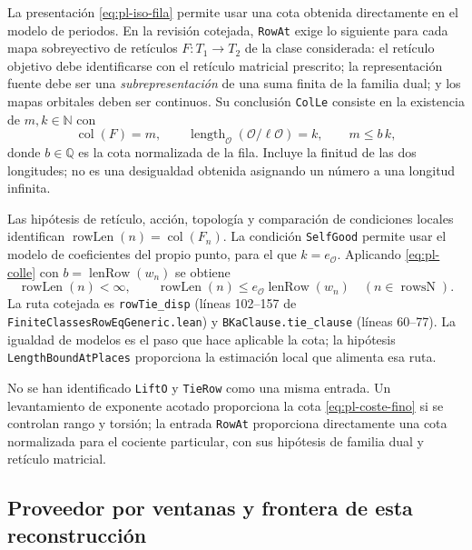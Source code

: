 La presentación \eqref{eq:pl-iso-fila} permite usar una cota
obtenida directamente en el modelo de periodos. En la revisión
cotejada, \texttt{RowAt} exige lo siguiente para cada mapa
sobreyectivo de retículos $F:T_1\to T_2$ de la clase considerada:
el retículo objetivo debe identificarse con el retículo matricial
prescrito; la representación fuente debe ser una
\emph{subrepresentación} de una suma finita de la familia dual;
y los mapas orbitales deben ser continuos. Su conclusión
\texttt{ColLe} consiste en la existencia de $m,k\in\mathbb N$ con
\begin{equation}
 \operatorname{col}(F)=m,\qquad
 \operatorname{length}_{\mathcal O}(\mathcal O/\ell\mathcal O)=k,
 \qquad m\leq b\,k,
 \label{eq:pl-colle}
\end{equation}
donde $b\in\mathbb Q$ es la cota normalizada de la fila. Incluye
la finitud de las dos longitudes; no es una desigualdad obtenida
asignando un número a una longitud infinita.

Las hipótesis de retículo, acción, topología y comparación de
condiciones locales identifican
$\operatorname{rowLen}(n)=\operatorname{col}(F_n)$. La condición
\texttt{SelfGood} permite usar el modelo de coeficientes del
propio punto, para el que $k=e_{\mathcal O}$. Aplicando
\eqref{eq:pl-colle} con $b=\operatorname{lenRow}(w_n)$ se obtiene
\begin{equation}
 \operatorname{rowLen}(n)<\infty,\qquad
 \operatorname{rowLen}(n)\leq
 e_{\mathcal O}\operatorname{lenRow}(w_n)
 \quad(n\in\operatorname{rowsN}).
 \label{eq:pl-tie}
\end{equation}
La ruta cotejada es
\texttt{rowTie\_disp} (líneas 102--157 de
\texttt{FiniteClassesRowEqGeneric.lean}) y
\texttt{BKaClause.tie\_clause} (líneas 60--77).
La igualdad de modelos es el paso que hace aplicable la cota;
la hipótesis \texttt{LengthBoundAtPlaces} proporciona la
estimación local que alimenta esa ruta.

No se han identificado \texttt{LiftO} y \texttt{TieRow} como una
misma entrada. Un levantamiento de exponente acotado proporciona
la cota \eqref{eq:pl-coste-fino} si se controlan rango y torsión;
la entrada \texttt{RowAt} proporciona directamente una cota
normalizada para el cociente particular, con sus hipótesis de
familia dual y retículo matricial.

\subsection{Proveedor por ventanas y frontera de esta reconstrucción}
\label{subsec:pl-ventanas}

